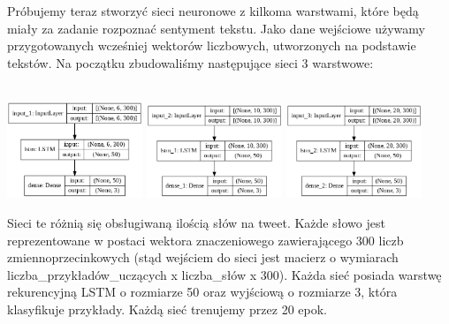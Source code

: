 \documentclass[11pt, a4paper, notitlepage]{report}
\begin{document}
Próbujemy teraz stworzyć sieci neuronowe z kilkoma warstwami, które będą miały za zadanie rozpoznać sentyment tekstu. Jako dane wejściowe używamy przygotowanych wcześniej wektorów liczbowych, utworzonych na podstawie tekstów. Na początku zbudowaliśmy następujące sieci 3 warstwowe:
\\ \\
\begin{center}
\includegraphics[width=115pt]{graphics/model_LSTM_3_warstwy_6.png}
\includegraphics[width=115pt]{graphics/model_LSTM_3_warstwy_10.png}
\includegraphics[width=115pt]{graphics/model_LSTM_3_warstwy_20.png}
\end{center}
Sieci te różnią się obsługiwaną ilością słów na tweet. Każde słowo jest reprezentowane w postaci wektora znaczeniowego zawierającego 300 liczb zmiennoprzecinkowych (stąd wejściem do sieci jest macierz o wymiarach liczba\_przykładów\_uczących x liczba\_słów x 300). Każda sieć posiada warstwę rekurencyjną LSTM o rozmiarze 50 oraz wyjściową o rozmiarze 3, która klasyfikuje przykłady. Każdą sieć trenujemy przez 20 epok.
\newpage
\end{document}

